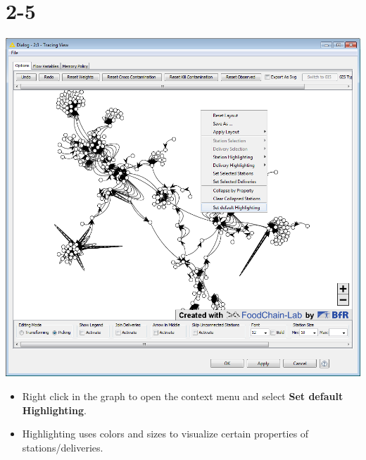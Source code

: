 \documentclass[10pt]{beamer}
\begin{document}
\section{2-5}
\begin{frame}
	\begin{center}
  		\includegraphics[height=0.6\textheight]{2-5.png}
	\end{center}
	\begin{itemize}
		\item Right click in the graph to open the context menu and select \textbf{Set default Highlighting}.
		\item Highlighting uses colors and sizes to visualize certain properties of stations/deliveries.
	\end{itemize}
\end{frame}
\end{document}
